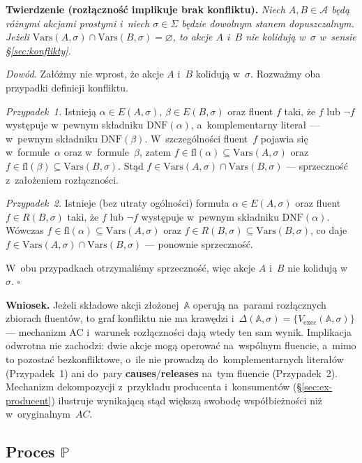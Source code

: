 \documentclass[11pt,a4paper]{article}
\newcommand{\causes}{\textbf{causes}}
\newcommand{\releases}{\textbf{releases}}
\newcommand{\DNF}{\mathrm{DNF}}
\theoremstyle{definition}
\begin{document}
\medskip
\noindent \textbf{Twierdzenie (rozłączność implikuje brak konfliktu).}
\emph{Niech $A, B \in \mathcal{A}$ będą różnymi akcjami prostymi
i~niech $\sigma \in \Sigma$ będzie dowolnym stanem dopuszczalnym.
Jeżeli $\mathrm{Vars}(A,\sigma) \cap \mathrm{Vars}(B,\sigma) = \varnothing$,
to akcje $A$ i~$B$ nie kolidują w~$\sigma$ w~sensie
\S\ref{sec:konflikty}.}

\medskip
\noindent \textit{Dowód.}
Załóżmy nie wprost, że akcje $A$ i~$B$ kolidują w~$\sigma$. Rozważmy
oba przypadki definicji konfliktu.

\emph{Przypadek~1.} Istnieją $\alpha \in E(A,\sigma)$, $\beta \in E(B,\sigma)$
oraz fluent $f$ taki, że $f$ lub $\neg f$ występuje w~pewnym składniku
$\DNF(\alpha)$, a~komplementarny literał --- w~pewnym składniku
$\DNF(\beta)$. W~szczególności fluent~$f$ pojawia się w~formule~$\alpha$
oraz w~formule~$\beta$, zatem $f \in \mathrm{fl}(\alpha) \subseteq
\mathrm{Vars}(A,\sigma)$ oraz $f \in \mathrm{fl}(\beta) \subseteq
\mathrm{Vars}(B,\sigma)$. Stąd $f \in \mathrm{Vars}(A,\sigma) \cap
\mathrm{Vars}(B,\sigma)$ --- sprzeczność z~założeniem rozłączności.

\emph{Przypadek~2.} Istnieje (bez utraty ogólności) formuła
$\alpha \in E(A,\sigma)$ oraz fluent $f \in R(B,\sigma)$ taki, że
$f$ lub $\neg f$ występuje w~pewnym składniku $\DNF(\alpha)$.
Wówczas $f \in \mathrm{fl}(\alpha) \subseteq \mathrm{Vars}(A,\sigma)$
oraz $f \in R(B,\sigma) \subseteq \mathrm{Vars}(B,\sigma)$, co daje
$f \in \mathrm{Vars}(A,\sigma) \cap \mathrm{Vars}(B,\sigma)$ ---
ponownie sprzeczność.

\noindent W~obu przypadkach otrzymaliśmy sprzeczność, więc akcje $A$
i~$B$ nie kolidują w~$\sigma$. \hfill$\square$

\medskip
\noindent \textbf{Wniosek.}
Jeżeli składowe akcji złożonej~$\mathbb{A}$ operują na~parami rozłącznych zbiorach
fluentów, to graf konfliktu nie ma krawędzi i~$\Delta(\mathbb{A},\sigma) =
\{V_{\mathrm{exec}}(\mathbb{A},\sigma)\}$ --- mechanizm AC i~warunek rozłączności dają
wtedy ten sam wynik. Implikacja odwrotna nie zachodzi: dwie akcje mogą operować na~wspólnym
fluencie, a~mimo to pozostać bezkonfliktowe, o~ile nie prowadzą do~komplementarnych literałów
(Przypadek~1) ani do~pary \causes{}/\releases{} na~tym fluencie (Przypadek~2). Mechanizm
dekompozycji z~przykładu producenta i~konsumentów (\S\ref{sec:ex-producent}) ilustruje
wynikającą stąd większą swobodę współbieżności niż w~oryginalnym~$AC$.

\subsection{Proces \texorpdfstring{$\mathbb{P}$}{P}}
\label{sec:proces}
\end{document}
